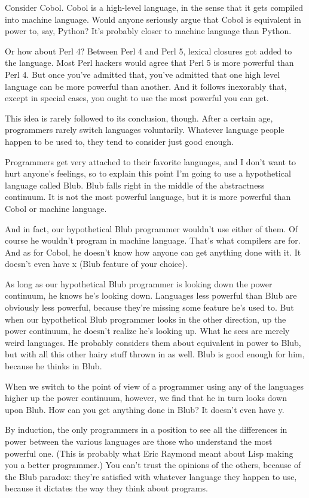 \documentclass[12pt]{book}
\begin{document}
Consider Cobol. Cobol is a high-level language, in the sense that it
gets compiled into machine language. Would anyone seriously argue that
Cobol is equivalent in power to, say, Python? It's probably closer to
machine language than Python.

Or how about Perl 4? Between Perl 4 and Perl 5, lexical closures got
added to the language. Most Perl hackers would agree that Perl 5 is more
powerful than Perl 4. But once you've admitted that, you've admitted
that one high level language can be more powerful than another. And it
follows inexorably that, except in special cases, you ought to use the
most powerful you can get.

This idea is rarely followed to its conclusion, though. After a certain
age, programmers rarely switch languages voluntarily. Whatever language
people happen to be used to, they tend to consider just good enough.

Programmers get very attached to their favorite languages, and I don't
want to hurt anyone's feelings, so to explain this point I'm going to
use a hypothetical language called Blub. Blub falls right in the middle
of the abstractness continuum. It is not the most powerful language, but
it is more powerful than Cobol or machine language.

And in fact, our hypothetical Blub programmer wouldn't use either of
them. Of course he wouldn't program in machine language. That's what
compilers are for. And as for Cobol, he doesn't know how anyone can get
anything done with it. It doesn't even have x (Blub feature of your
choice).

As long as our hypothetical Blub programmer is looking down the power
continuum, he knows he's looking down. Languages less powerful than Blub
are obviously less powerful, because they're missing some feature he's
used to. But when our hypothetical Blub programmer looks in the other
direction, up the power continuum, he doesn't realize he's looking up.
What he sees are merely weird languages. He probably considers them
about equivalent in power to Blub, but with all this other hairy stuff
thrown in as well. Blub is good enough for him, because he thinks in
Blub.

When we switch to the point of view of a programmer using any of the
languages higher up the power continuum, however, we find that he in
turn looks down upon Blub. How can you get anything done in Blub? It
doesn't even have y.

By induction, the only programmers in a position to see all the
differences in power between the various languages are those who
understand the most powerful one. (This is probably what Eric Raymond
meant about Lisp making you a better programmer.) You can't trust the
opinions of the others, because of the Blub paradox: they're satisfied
with whatever language they happen to use, because it dictates the way
they think about programs.
\end{document}
